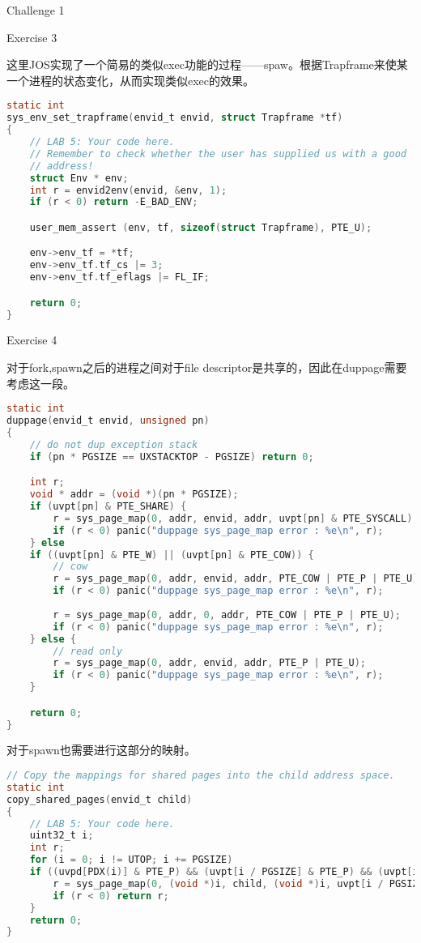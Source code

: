 \documentclass[GBK,winfonts,a4paper,10pt]{ctexart}
\begin{document}
\begin{section}{ Challenge 1 }
\end{section}

\begin{section}{ Exercise 3 }
\par
这里JOS实现了一个简易的类似exec功能的过程——spaw。根据Trapframe来使某一个进程的状态变化，从而实现类似exec的效果。
\begin{lstlisting}[language=C]      
static int
sys_env_set_trapframe(envid_t envid, struct Trapframe *tf)
{
	// LAB 5: Your code here.
	// Remember to check whether the user has supplied us with a good
	// address!
	struct Env * env;
	int r = envid2env(envid, &env, 1);
	if (r < 0) return -E_BAD_ENV;	

	user_mem_assert (env, tf, sizeof(struct Trapframe), PTE_U);

	env->env_tf = *tf;
	env->env_tf.tf_cs |= 3;
	env->env_tf.tf_eflags |= FL_IF;

	return 0;
}
\end{lstlisting}
\end{section}

\begin{section}{ Exercise 4 }
\par
对于fork,spawn之后的进程之间对于file descriptor是共享的，因此在duppage需要考虑这一段。
\begin{lstlisting}[language = C]
static int
duppage(envid_t envid, unsigned pn)
{
	// do not dup exception stack
	if (pn * PGSIZE == UXSTACKTOP - PGSIZE) return 0;

	int r;
	void * addr = (void *)(pn * PGSIZE);
    if (uvpt[pn] & PTE_SHARE) {
        r = sys_page_map(0, addr, envid, addr, uvpt[pn] & PTE_SYSCALL);
        if (r < 0) panic("duppage sys_page_map error : %e\n", r);
    } else
	if ((uvpt[pn] & PTE_W) || (uvpt[pn] & PTE_COW)) {
		// cow
		r = sys_page_map(0, addr, envid, addr, PTE_COW | PTE_P | PTE_U);
		if (r < 0) panic("duppage sys_page_map error : %e\n", r);
		
		r = sys_page_map(0, addr, 0, addr, PTE_COW | PTE_P | PTE_U);
		if (r < 0) panic("duppage sys_page_map error : %e\n", r);
	} else {
		// read only
		r = sys_page_map(0, addr, envid, addr, PTE_P | PTE_U);
		if (r < 0) panic("duppage sys_page_map error : %e\n", r);
	}

	return 0;
}
\end{lstlisting}
\par
对于spawn也需要进行这部分的映射。
\begin{lstlisting}[language = C]
// Copy the mappings for shared pages into the child address space.
static int
copy_shared_pages(envid_t child)
{
	// LAB 5: Your code here.
    uint32_t i;
    int r;
    for (i = 0; i != UTOP; i += PGSIZE) 
    if ((uvpd[PDX(i)] & PTE_P) && (uvpt[i / PGSIZE] & PTE_P) && (uvpt[i / PGSIZE] & PTE_SHARE)) {
        r = sys_page_map(0, (void *)i, child, (void *)i, uvpt[i / PGSIZE] & PTE_SYSCALL);
        if (r < 0) return r;
    }
	return 0;
}
\end{lstlisting}
\end{section}
\end{document}
